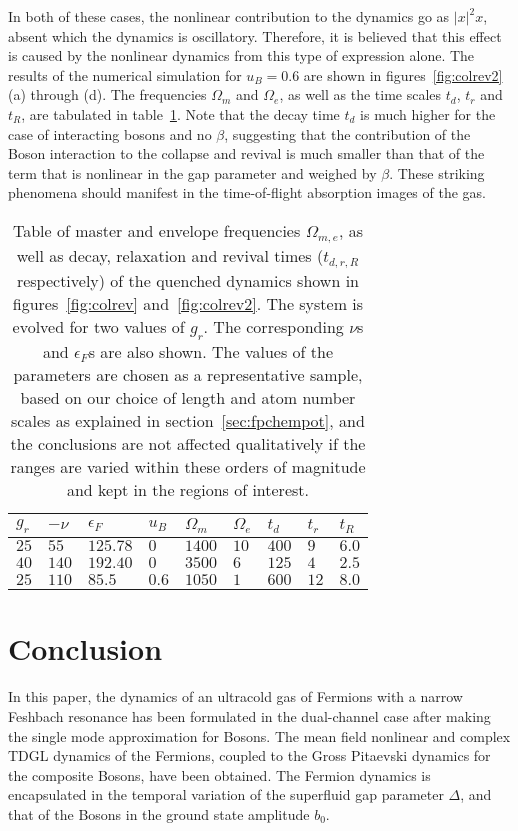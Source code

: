 \documentclass[a4paper,10pt]{article}
\begin{document}
In both of these cases, the nonlinear contribution to the dynamics go as $|x|^2 x$, absent which the dynamics is oscillatory. Therefore, it is believed that this effect is caused by the nonlinear dynamics from this type of expression alone. The results of the numerical simulation for $u_B = 0.6$ are shown in figures~\ref{fig:colrev2}(a) through (d). The frequencies $\Omega_m$  and $\Omega_e$, as well as the time scales $t_d$, $t_r$ and $t_R$, are tabulated in table~\ref{tab:colrev}. Note that the decay time $t_d$ is much higher for the case of interacting bosons and no $\beta$, suggesting that the contribution of the Boson interaction to the collapse and revival is much smaller than that of the term that is nonlinear in the gap parameter and weighed by $\beta$. These striking phenomena should manifest in the time-of-flight absorption images of the gas.
\begin{table}
\begin{center}
\begin{tabular}{ | l  l  l  l|| l | l | l | l | l |}
      \hline
  $g_r$ 	& $-\nu$  & $\epsilon_F$ &$u_B$	& $\Omega_m$    & $\Omega_e$     & $t_d$ 	& $t_r$ & $t_R$ \\  \hline  \hline
  $25$		& $55$	  & $125.78$ 	 &$0$ 	& $1400$	& $10$		 & $400$ 	& $9$	& $6.0$   \\  \hline
  $40$		& $140$	  & $192.40$ 	 &$0$	& $3500$	& $6$		 & $125$	& $4$	& $2.5$ \\  \hline
  $25$		& $110$	  & $85.5$	 &$0.6$ & $1050$	& $1$		 & $600$	& $12$  & $8.0$ \\  \hline
     \end{tabular}
\caption{Table of master and envelope frequencies $\Omega_{m,e}$, as well as decay, relaxation and revival times ($t_{d,r,R}$ respectively) of the quenched dynamics shown in figures~\ref{fig:colrev} and~\ref{fig:colrev2}. The system is evolved for two values of $g_r$. The corresponding $\nu$s and $\epsilon_F$s are also shown.  {The values of the parameters are chosen as a representative sample, based on our choice of length and atom number scales as explained in section}~\ref{sec:fpchempot},  {and the conclusions are not affected qualitatively if the ranges are varied within these orders of magnitude and kept in the regions of interest.}}
\label{tab:colrev}
\end{center}
\end{table}

\section{Conclusion}
\label{sec:conclusion}
In this paper, the dynamics of an ultracold gas of Fermions with a narrow Feshbach resonance has been formulated in the dual-channel case after making the single mode approximation for Bosons. The mean field nonlinear and complex TDGL dynamics of the Fermions, coupled to the Gross Pitaevski dynamics for the composite Bosons, have been obtained. The Fermion dynamics is encapsulated in the temporal variation of the superfluid gap parameter $\Delta$, and that of the Bosons in the ground state amplitude $b_0$.
\end{document}

